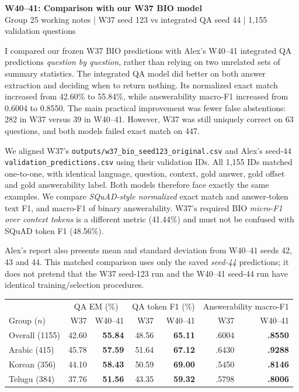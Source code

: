 \documentclass[10pt,a4paper]{article}
\newcommand{\sectionline}[1]{\vspace{5pt}{\large\bfseries #1}\par\vspace{1pt}}
\begin{document}
\fontsize{9.45}{12.1}\selectfont
\begin{center}
{\Large\bfseries W40--41: Comparison with our W37 BIO model}\\[3pt]
{\small Group 25 working notes | W37 seed 123 vs integrated QA seed 44 | 1,155 validation questions}
\end{center}
\vspace{-8pt}

\sectionline{Quick summary}
I compared our frozen W37 BIO predictions with Alex's W40--41 integrated QA predictions \emph{question by question}, rather than relying on two unrelated sets of summary statistics. The integrated QA model did better on both answer extraction and deciding when to return nothing. Its normalized exact match increased from 42.60\% to 55.84\%, while answerability macro-F1 increased from 0.6004 to 0.8550. The main practical improvement was fewer false abstentions: 282 in W37 versus 39 in W40--41. However, W37 was still uniquely correct on 63 questions, and both models failed exact match on 447.

\sectionline{1. How the comparison was done}
We aligned W37's \texttt{outputs/w37\_bio\_seed123\_original.csv} and Alex's seed-44 \texttt{validation\_predictions.csv} using their validation IDs. All 1,155 IDs matched one-to-one, with identical language, question, context, gold answer, gold offset and gold answerability label. Both models therefore face exactly the same examples. We compare \emph{SQuAD-style normalized} exact match and answer-token text F1, and macro-F1 of binary answerability. W37's required BIO \emph{micro-F1 over context tokens} is a different metric (41.44\%) and must not be confused with SQuAD token F1 (48.56\%).

Alex's report also presents mean and standard deviation from W40--41 seeds 42, 43 and 44. This matched comparison uses only the saved \emph{seed-44} predictions; it does not pretend that the W37 seed-123 run and the W40--41 seed-44 run have identical training/selection procedures.

\sectionline{2. Actual validation results}
\begin{center}
\begin{tabular}{@{}lrrrrrr@{}}
\toprule
& \multicolumn{2}{c}{QA EM (\%)} & \multicolumn{2}{c}{QA token F1 (\%)} & \multicolumn{2}{c}{Answerability macro-F1}\\
Group ($n$) & W37 & W40--41 & W37 & W40--41 & W37 & W40--41\\
\midrule
Overall (1155) & 42.60 & \textbf{55.84} & 48.56 & \textbf{65.11} & .6004 & \textbf{.8550}\\
Arabic (415) & 45.78 & \textbf{57.59} & 51.64 & \textbf{67.12} & .6430 & \textbf{.9288}\\
Korean (356) & 44.10 & \textbf{58.43} & 50.59 & \textbf{69.00} & .5450 & \textbf{.8146}\\
Telugu (384) & 37.76 & \textbf{51.56} & 43.35 & \textbf{59.32} & .5798 & \textbf{.8006}\\
\bottomrule
\end{tabular}
\end{center}
\end{document}
